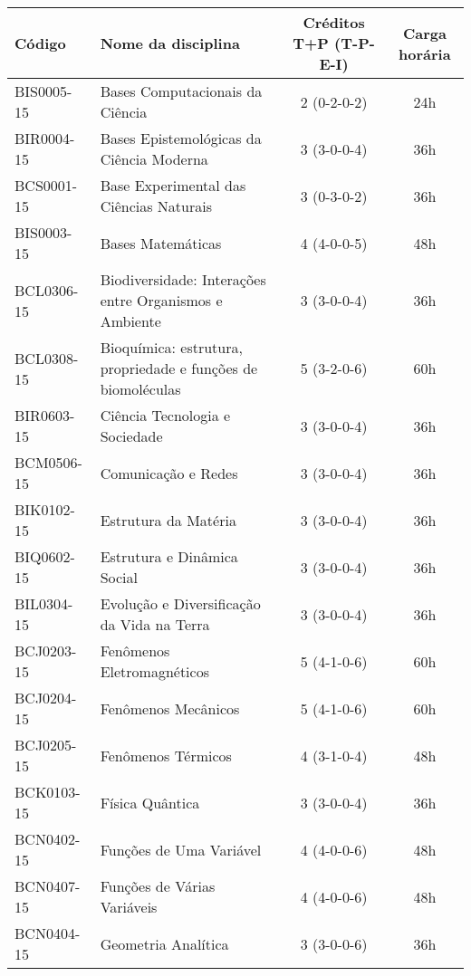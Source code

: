 \begin{table}[h!]
    \centering
    \begin{tabular}{|l|p{}|c|c|}
        \hline
        \textbf{Código} & \textbf{Nome da disciplina} & \textbf{Créditos T+P (T-P-E-I)} & \textbf{Carga horária}\\
        \hline\hline
        BIS0005-15 & Bases Computacionais da Ciência & 2 (0-2-0-2) & 24h\\
        \hline
        BIR0004-15 & Bases Epistemológicas da Ciência Moderna & 3 (3-0-0-4) & 36h\\
        \hline
        BCS0001-15 & Base Experimental das Ciências Naturais & 3 (0-3-0-2) & 36h\\
        \hline
        BIS0003-15 & Bases Matemáticas & 4 (4-0-0-5) & 48h\\
        \hline
        BCL0306-15 & Biodiversidade: Interações entre Organismos e Ambiente & 3 (3-0-0-4) & 36h\\
        \hline
        BCL0308-15 & Bioquímica: estrutura, propriedade e funções de biomoléculas & 5 (3-2-0-6) & 60h\\
        \hline
        BIR0603-15 & Ciência Tecnologia e Sociedade & 3 (3-0-0-4) & 36h\\
        \hline
        BCM0506-15 & Comunicação e Redes & 3 (3-0-0-4) & 36h\\
        \hline
        BIK0102-15 & Estrutura da Matéria & 3 (3-0-0-4) & 36h\\
        \hline
        BIQ0602-15 & Estrutura e Dinâmica Social & 3 (3-0-0-4) & 36h \\
        \hline
        BIL0304-15 & Evolução e Diversificação da Vida na Terra & 3 (3-0-0-4) & 36h\\
        \hline
        BCJ0203-15 & Fenômenos Eletromagnéticos & 5 (4-1-0-6) & 60h\\
        \hline
        BCJ0204-15 & Fenômenos Mecânicos & 5 (4-1-0-6) & 60h \\
        \hline
        BCJ0205-15 & Fenômenos Térmicos & 4 (3-1-0-4) & 48h\\
        \hline
        BCK0103-15 & Física Quântica & 3 (3-0-0-4) & 36h\\
        \hline
        BCN0402-15 & Funções de Uma Variável & 4 (4-0-0-6) & 48h\\
        \hline
        BCN0407-15 & Funções de Várias Variáveis & 4 (4-0-0-6) & 48h \\
        \hline
        BCN0404-15 & Geometria Analítica & 3 (3-0-0-6) & 36h\\
        \hline

\end{tabular}
\end{table}
